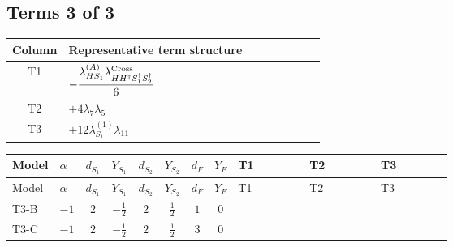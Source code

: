 \documentclass[8pt]{article}
\begin{document}
\begin{landscape}
\subsection*{Terms 3 of 3}
\begin{center}
\begin{tabular}{@{}c >{\raggedright\arraybackslash}p{0.82\linewidth}@{}}
\toprule
Column & Representative term structure \\
\midrule
T1 & \(\displaystyle -\frac{{\lambda_{HS_1}^{(A)}} {\lambda_{H H^\dagger S_1^\dagger S_2^\dagger}^{\rm Cross}}}{6}\) \\
\midrule
T2 & \(\displaystyle +4 {\lambda_7} {\lambda_5}\) \\
\midrule
T3 & \(\displaystyle +12 {\lambda_{S_1}^{(1)}} {\lambda_{11}}\) \\
\midrule
\bottomrule
\end{tabular}
\end{center}
\smallskip
\tiny
\begin{longtable}{@{}llcccccc >{\raggedright\arraybackslash}p{0.21\linewidth} >{\raggedright\arraybackslash}p{0.21\linewidth} >{\raggedright\arraybackslash}p{0.21\linewidth}@{}}
\toprule
Model & $\alpha$ & $d_{S_1}$ & $Y_{S_1}$ & $d_{S_2}$ & $Y_{S_2}$ & $d_F$ & $Y_F$ & T1 & T2 & T3 \\
\midrule
\endfirsthead
\toprule
Model & $\alpha$ & $d_{S_1}$ & $Y_{S_1}$ & $d_{S_2}$ & $Y_{S_2}$ & $d_F$ & $Y_F$ & T1 & T2 & T3 \\
\midrule
\endhead
T3-B & $-1$ & $2$ & $-\frac{1}{2}$ & $2$ & $\frac{1}{2}$ & $1$ & $0$ & \scriptsize\adjustbox{max width=\linewidth}{$\begin{gathered} -\frac{{\lambda_{HS_1}^{(A)}} {\lambda_{H H^\dagger S_1^\dagger S_2^\dagger}^{\rm Cross}}}{6}\end{gathered}$} & \scriptsize\adjustbox{max width=\linewidth}{$\begin{gathered} +4 {\lambda_7} {\lambda_5}\end{gathered}$} & \scriptsize\adjustbox{max width=\linewidth}{$\begin{gathered} +12 {\lambda_{S_1}^{(1)}} {\lambda_{11}}\end{gathered}$} \\
\midrule
T3-C & $-1$ & $2$ & $-\frac{1}{2}$ & $2$ & $\frac{1}{2}$ & $3$ & $0$ & \scriptsize\adjustbox{max width=\linewidth}{$\begin{gathered} -\frac{{\lambda_{HS_1}^{(A)}} {\lambda_{H H^\dagger S_1^\dagger S_2^\dagger}^{\rm Cross}}}{6}\end{gathered}$} & \scriptsize\adjustbox{max width=\linewidth}{$\begin{gathered} +4 {\lambda_7} {\lambda_5}\end{gathered}$} & \scriptsize\adjustbox{max width=\linewidth}{$\begin{gathered} +12 {\lambda_{S_1}^{(1)}} {\lambda_{11}}\end{gathered}$} \\

\end{longtable}
\end{landscape}
\end{document}
